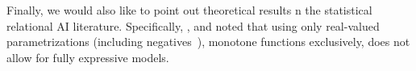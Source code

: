 Finally, we would also like to point out theoretical results n the statistical relational AI literature. Specifically, \citet{buchman2017rules}, and \citet{kuzelka2020complex} noted that using only real-valued parametrizations (including negatives~\citep{buchman2017negative}), \ie monotone functions exclusively, does not allow for fully expressive models.














































